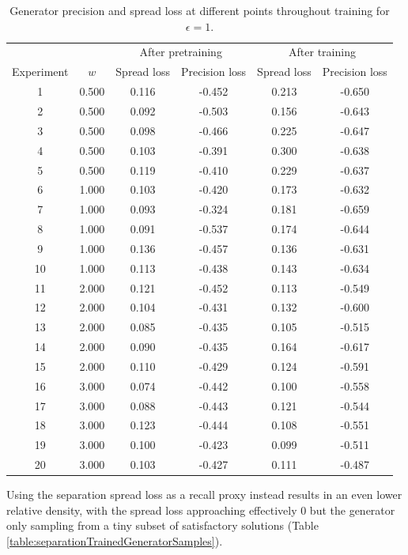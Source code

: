 \documentclass[../../main.tex]{subfiles}
\begin{document}
\begin{table}[H]
    \centering
    \begin{tabular}{*6c}
    \toprule
    {} & {} & \multicolumn{2}{c}{After pretraining} & \multicolumn{2}{c}{After training}\\
    Experiment&$w$&Spread loss&Precision loss&Spread loss&Precision loss\\
    \midrule
    1&0.500&0.116&-0.452&0.213&-0.650\\2&0.500&0.092&-0.503&0.156&-0.643\\3&0.500&0.098&-0.466&0.225&-0.647\\4&0.500&0.103&-0.391&0.300&-0.638\\5&0.500&0.119&-0.410&0.229&-0.637\\6&1.000&0.103&-0.420&0.173&-0.632\\7&1.000&0.093&-0.324&0.181&-0.659\\8&1.000&0.091&-0.537&0.174&-0.644\\9&1.000&0.136&-0.457&0.136&-0.631\\10&1.000&0.113&-0.438&0.143&-0.634\\11&2.000&0.121&-0.452&0.113&-0.549\\12&2.000&0.104&-0.431&0.132&-0.600\\13&2.000&0.085&-0.435&0.105&-0.515\\14&2.000&0.090&-0.435&0.164&-0.617\\15&2.000&0.110&-0.429&0.124&-0.591\\16&3.000&0.074&-0.442&0.100&-0.558\\
    17&3.000&0.088&-0.443&0.121&-0.544\\18&3.000&0.123&-0.444&0.108&-0.551\\19&3.000&0.100&-0.423&0.099&-0.511\\20&3.000&0.103&-0.427&0.111&-0.487\\
    \bottomrule
    \end{tabular}
    \caption{Generator precision and spread loss at different points throughout training for $\epsilon=1$.}
    \label{table:generatorTrainingProgression}
\end{table}
Using the separation spread loss as a recall proxy instead results in an even lower relative density, with the spread loss approaching effectively $0$ but the generator only sampling from a tiny subset of satisfactory solutions (Table \ref{table:separationTrainedGeneratorSamples}).
\end{document}
